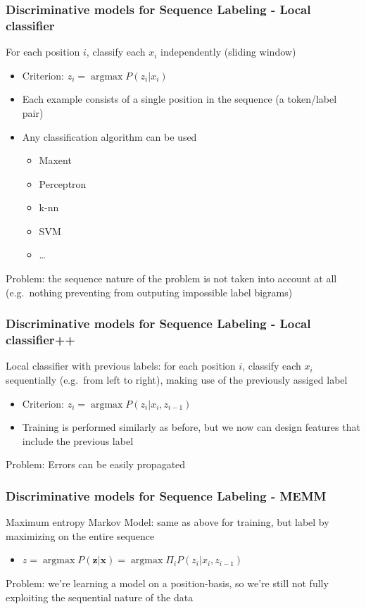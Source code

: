 \documentclass[usenames,dvipsnames]{beamer}
\DeclareMathOperator*{\argmax}{argmax}
\newcommand{\x}{\mathbf{x}}
\newcommand{\z}{\mathbf{z}}
\begin{document}
\begin{frame}\frametitle{Discriminative models for Sequence Labeling -
  Local classifier}

For each position $i$, classify each $x_i$ independently (sliding window)
\begin{itemize}
\item Criterion: $z_i = \argmax P(z_i|x_i)$
\item Each example consists of a single position in the sequence (a token/label pair)
\item Any classification algorithm can be used \pause
\begin{itemize}
\item Maxent
\item Perceptron
\item k-nn
\item SVM
\item \dots
\end{itemize}
\end{itemize}

\pause
\vspace{0.4cm}
Problem: the sequence nature of the problem is not taken into account
at all (e.g.\ nothing preventing from outputing impossible label bigrams)
\end{frame}

\begin{frame}\frametitle{Discriminative models for Sequence Labeling -
  Local classifier++}

Local classifier with previous labels: for each position $i$, classify
each $x_i$ sequentially (e.g.\ from left to right), making use of the previously assiged label
\begin{itemize}
\item Criterion: $z_i = \argmax P(z_i|x_i, z_{i-1})$
\item Training is performed similarly as before, but we now can design
  features that include the previous label
\end{itemize}

\pause
\vspace{0.4cm}
Problem: Errors can be easily propagated

\end{frame}


\begin{frame}\frametitle{Discriminative models for Sequence Labeling -
  MEMM}

Maximum entropy Markov Model: same as above for training, but label by maximizing on the entire sequence
\begin{itemize}
\item $z = \argmax P(\z|\x) = \argmax \Pi_i P(z_i|x_i, z_{i-1})$
\end{itemize}

\pause
\vspace{0.4cm}
Problem: we're learning a model on a position-basis, so we're
  still not fully exploiting the sequential nature of the data

\end{frame}
\end{document}

